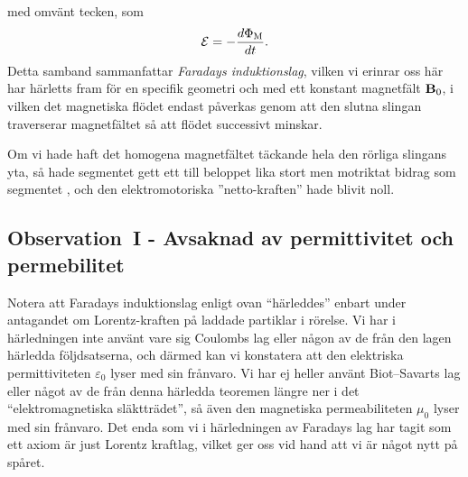 med omv{\"a}nt tecken, som
$$
  {\cal E}=-{{d\Phi_{\rm M}}\over{dt}}.
$$
Detta samband sammanfattar {\it Faradays induktionslag},
vilken vi erinrar oss h{\"a}r har h{\"a}rletts fram f{\"o}r en specifik
geometri och med ett konstant magnetf{\"a}lt ${\bf B}_0$, i vilken det
magnetiska fl{\"o}det endast p{\aa}verkas genom att den slutna slingan
traverserar magnetf{\"a}ltet s{\aa} att fl{\"o}det successivt minskar.

Om vi hade haft det homogena magnetf{\"a}ltet t{\"a}ckande hela den r{\"o}rliga
slingans yta, s{\aa} hade segmentet  gett ett till beloppet lika
stort men motriktat bidrag som segmentet , och den elektromotoriska
''netto-kraften'' hade blivit noll.
\vfill\eject

\subsection{Observation~I - Avsaknad av permittivitet och permebilitet}
Notera att Faradays induktionslag enligt ovan
``h{\"a}rleddes''
enbart under antagandet om Lorentz-kraften p{\aa} laddade partiklar i
r{\"o}relse.
Vi har i h{\"a}rledningen inte anv{\"a}nt vare sig Coulombs lag eller n{\aa}gon
av de fr{\aa}n den lagen h{\"a}rledda f{\"o}ljdsatserna, och d{\"a}rmed kan vi
konstatera att den elektriska permittiviteten $\varepsilon_0$ lyser med sin
fr{\aa}nvaro.
Vi har ej heller anv{\"a}nt Biot--Savarts lag eller n{\aa}got av de fr{\aa}n
denna h{\"a}rledda teoremen l{\"a}ngre ner i det ``elektromagnetiska
sl{\"a}kttr{\"a}det'', s{\aa} {\"a}ven den magnetiska permeabiliteten $\mu_0$
lyser med sin fr{\aa}nvaro.
Det enda som vi i h{\"a}rledningen av Faradays lag har tagit som ett axiom
{\"a}r just Lorentz kraftlag, vilket ger oss vid hand att vi {\"a}r n{\aa}got
nytt p{\aa} sp{\aa}ret.

